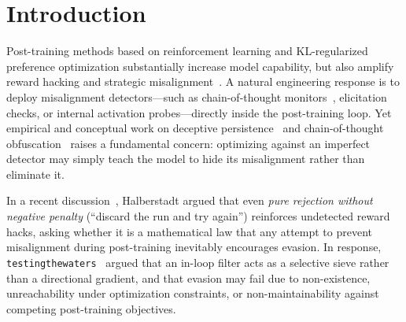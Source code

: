 \documentclass[11pt,a4paper]{article}
\begin{document}
\section{Introduction}

Post-training methods based on reinforcement learning and KL-regularized preference optimization substantially increase model capability, but also amplify reward hacking and strategic misalignment~\cite{zhuang2021,skalse2022,gao2022}. A natural engineering response is to deploy misalignment detectors---such as chain-of-thought monitors~\cite{baker2025}, elicitation checks, or internal activation probes---directly inside the post-training loop. Yet empirical and conceptual work on deceptive persistence~\cite{hubinger2024,greenblatt2024} and chain-of-thought obfuscation~\cite{baker2025} raises a fundamental concern: optimizing against an imperfect detector may simply teach the model to hide its misalignment rather than eliminate it.

In a recent discussion~\cite{halberstadt2026}, Halberstadt argued that even \emph{pure rejection without negative penalty} (``discard the run and try again'') reinforces undetected reward hacks, asking whether it is a mathematical law that any attempt to prevent misalignment during post-training inevitably encourages evasion. In response, \texttt{testingthewaters}~\cite{testingthewaters2026} argued that an in-loop filter acts as a selective sieve rather than a directional gradient, and that evasion may fail due to non-existence, unreachability under optimization constraints, or non-maintainability against competing post-training objectives.
\end{document}
